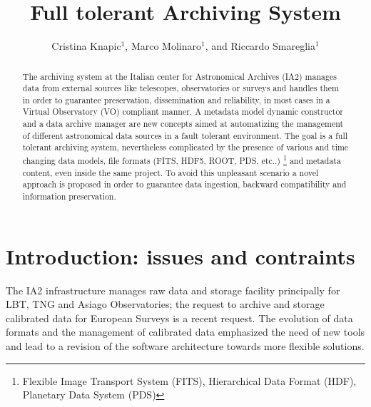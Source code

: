\documentclass[11pt,twoside]{article}
\begin{document}
\title{Full tolerant Archiving System}
\author{Cristina Knapic$^1$, Marco Molinaro$^1$, and Riccardo Smareglia$^1$
}


\begin{abstract}
The archiving system at the Italian center for Astronomical Archives (IA2) manages
data from external sources like telescopes, observatories or surveys and handles
them in order to guarantee preservation, dissemination and reliability, in most
cases in a Virtual Observatory (VO) compliant manner. A metadata model dynamic
constructor and a data archive manager are new concepts aimed at automatizing the
management of different astronomical data sources in a fault tolerant environment.
The goal is a full tolerant archiving system, nevertheless complicated by the presence
of various and time changing data models, file formats (FITS, HDF5, ROOT, PDS, etc..)
\footnote{Flexible Image Transport System (FITS), Hierarchical Data Format (HDF), Planetary Data System (PDS)}
and metadata content, even inside the same project. To avoid this
unpleasant scenario a novel approach is proposed in order to guarantee data ingestion,
backward compatibility and information preservation.
\end{abstract}

\section{Introduction: issues and contraints}
The IA2 infrastructure manages raw data and storage facility principally
for LBT, TNG and Asiago Observatories; the request to archive and storage
calibrated data for European Surveys is a recent request. The evolution of
data formats and the management of calibrated data emphasized the need of
new tools and lead to a revision of the software architecture towards more
flexible solutions.
\end{document}

